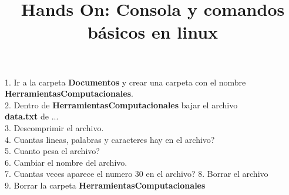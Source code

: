 \documentclass{article}
\title{Hands On: Consola y comandos b\'asicos en linux}
\begin{document}
\maketitle

1. Ir a la carpeta \textbf{Documentos} y crear una carpeta con el nombre \textbf{HerramientasComputacionales}.\\
2. Dentro de \textbf{HerramientasComputacionales} bajar el archivo\\ \textbf{data.txt} de ...\\
3. Descomprimir el archivo.\\
4. Cuantas lineas, palabras y caracteres hay en el archivo?\\
5. Cuanto pesa el archivo?	\\
6. Cambiar el nombre del archivo.\\
7. Cuantas veces aparece el numero 30 en el archivo?
8. Borrar el archivo\\
9. Borrar la carpeta \textbf{HerramientasComputacionales}
\end{document}
